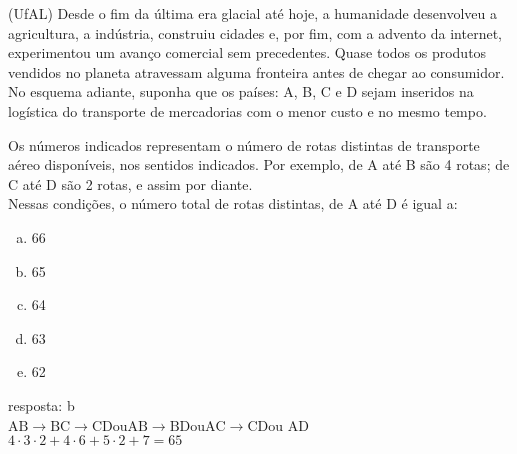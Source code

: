\begin{ex}
 (UfAL) Desde o fim da última era glacial até hoje, a humanidade desenvolveu a agricultura, a indústria, construiu cidades e, por fim, com a advento da internet, experimentou um avanço comercial sem precedentes. Quase todos os produtos vendidos no planeta atravessam alguma fronteira antes de chegar ao consumidor. No esquema adiante, suponha que os países: A, B, C e D sejam inseridos na logística do transporte de mercadorias com o menor custo e no mesmo tempo.

\begin{center}    
\end{center}



Os números indicados representam o número de rotas distintas de transporte aéreo disponíveis, nos sentidos indicados. Por exemplo, de A  até B são 4 rotas; de C até D são 2 rotas, e assim por diante.\\
Nessas condições, o número total de rotas distintas, de A até D é igual a:
    \begin{enumerate}[(a)]
    \item 66
    \item 65
    \item 64
    \item 63
    \item 62
    \end{enumerate}
      \begin{sol}
      resposta: b  \\
      $\mathrm{AB}\rightarrow\mathrm{BC}\rightarrow\mathrm{CD}$\hspace{0.2cm}ou\hspace{0.2cm}$\mathrm{AB}\rightarrow\mathrm{BD}$\hspace{0.2cm}ou\hspace{0.2cm}$\mathrm{AC}\rightarrow\mathrm{CD}$\hspace{0.2cm}ou\hspace{0.2cm} AD \\
      $4\cdot3\cdot2+4\cdot6+5\cdot2+7=65$
      \end{sol}
\end{ex}